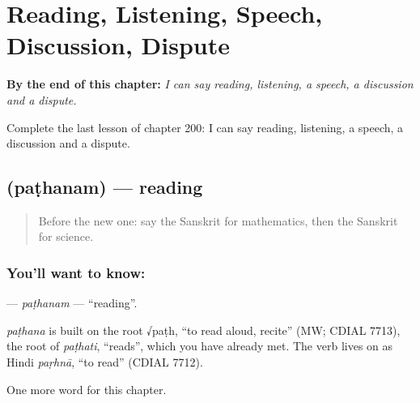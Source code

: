 
\chapter{Reading, Listening, Speech, Discussion, Dispute}
\label{ch:sa-reading-listening-speech-discussion-dispute}

\begin{chapteropening}
\textbf{By the end of this chapter:} \emph{I can say reading, listening, a speech, a discussion and a dispute.}

Complete the last lesson of chapter 200: I can say reading, listening, a speech, a discussion and a dispute.
\end{chapteropening}

\section[\texorpdfstring{\sk{पठनम्} (paṭhanam)}{पठनम् (paṭhanam)}]{ (paṭhanam) — reading}

\label{lesson:SA-C200-pathanam}



\begin{quote}
Before the new one: say the Sanskrit for mathematics, then the Sanskrit for science.
\end{quote}

\subsection*{You'll want to know: }
\textbf{} — \emph{paṭhanam} — \textquotedblleft{}reading\textquotedblright{}.

\begin{cousinweb}
\emph{paṭhana} is built on the root √paṭh, \textquotedblleft{}to read aloud, recite\textquotedblright{} (MW; CDIAL 7713), the root of \emph{paṭhati}, \textquotedblleft{}reads\textquotedblright{}, which you have already met. The verb lives on as Hindi \emph{paṛhnā}, \textquotedblleft{}to read\textquotedblright{} (CDIAL 7712).
\end{cousinweb}

\begin{grammarlens}[title={What you've built}]
One more word for this chapter.
\end{grammarlens}

